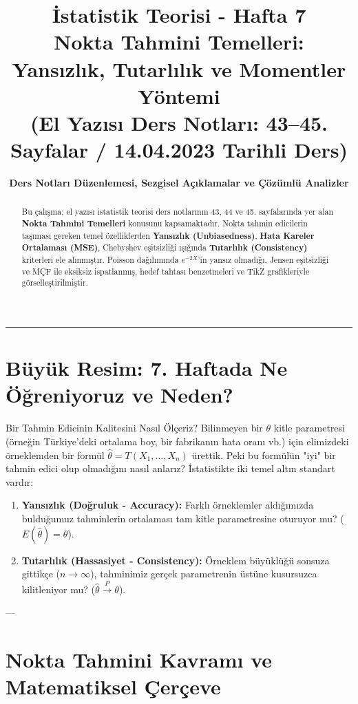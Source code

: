 \documentclass[11pt,a4paper]{article}
\title{\textbf{\LARGE İstatistik Teorisi - Hafta 7}\\[0.3em]
\Large Nokta Tahmini Temelleri: Yansızlık, Tutarlılık ve Momentler Yöntemi\\[0.2em]
\normalsize (El Yazısı Ders Notları: 43--45. Sayfalar / 14.04.2023 Tarihli Ders)}
\author{\textbf{Ders Notları Düzenlemesi, Sezgisel Açıklamalar ve Çözümlü Analizler}}
\date{}
\begin{document}
\maketitle

\begin{abstract}
Bu çalışma; el yazısı istatistik teorisi ders notlarının 43, 44 ve 45. sayfalarında yer alan \textbf{Nokta Tahmini Temelleri} konusunu kapsamaktadır. Nokta tahmin edicilerin taşıması gereken temel özelliklerden \textbf{Yansızlık (Unbiasedness)}, \textbf{Hata Kareler Ortalaması (MSE)}, Chebyshev eşitsizliği ışığında \textbf{Tutarlılık (Consistency)} kriterleri ele alınmıştır. Poisson dağılımında $e^{-2\bar{X}}$'in yansız olmadığı, Jensen eşitsizliği ve MÇF ile eksiksiz ispatlanmış, hedef tahtası benzetmeleri ve TikZ grafikleriyle görselleştirilmiştir.
\end{abstract}

\hrule
\vspace{1em}

\section{Büyük Resim: 7. Haftada Ne Öğreniyoruz ve Neden?}

\begin{sezgi}{Bir Tahmin Edicinin Kalitesini Nasıl Ölçeriz?}
Bilinmeyen bir $\theta$ kitle parametresi (örneğin Türkiye'deki ortalama boy, bir fabrikanın hata oranı vb.) için elimizdeki örneklemden bir formül $\hat{\theta} = T(X_1, \dots, X_n)$ ürettik.  
Peki bu formülün "iyi" bir tahmin edici olup olmadığını nasıl anlarız? İstatistikte iki temel altın standart vardır:
\begin{enumerate}
    \item \textbf{Yansızlık (Doğruluk - Accuracy):} Farklı örneklemler aldığımızda bulduğumuz tahminlerin ortalaması tam kitle parametresine oturuyor mu? ($E(\hat{\theta}) = \theta$).
    \item \textbf{Tutarlılık (Hassasiyet - Consistency):} Örneklem büyüklüğü sonsuza gittikçe ($n \to \infty$), tahminimiz gerçek parametrenin üstüne kusursuzca kilitleniyor mu? ($\hat{\theta} \xrightarrow{P} \theta$).
\end{enumerate}
\end{sezgi}

---

\section{Nokta Tahmini Kavramı ve Matematiksel Çerçeve}
\end{document}
